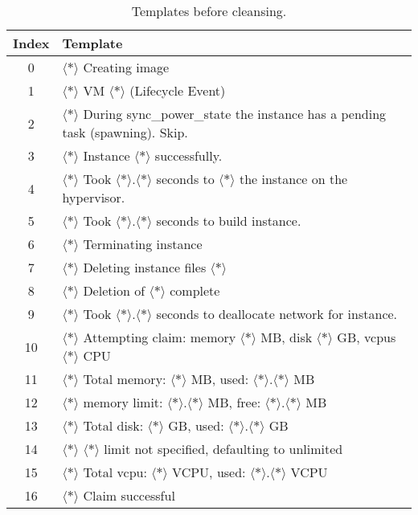 \begin{table}[ht]
\begin{small}
\centering
\begin{tabular}{ c l } 
\toprule
Index & Template \\
\midrule
0 & $\langle*\rangle$ Creating image\\
1 & $\langle*\rangle$ VM $\langle*\rangle$ (Lifecycle Event)\\
2 & $\langle*\rangle$ During sync\_power\_state the instance has a pending task (spawning). Skip.\\
3 & $\langle*\rangle$ Instance $\langle*\rangle$ successfully.\\
4 & $\langle*\rangle$ Took $\langle*\rangle$.$\langle*\rangle$ seconds to $\langle*\rangle$ the instance on the hypervisor.\\
5 & $\langle*\rangle$ Took $\langle*\rangle$.$\langle*\rangle$ seconds to build instance.\\
6 & $\langle*\rangle$ Terminating instance\\
7 & $\langle*\rangle$ Deleting instance files $\langle*\rangle$\\
8 & $\langle*\rangle$ Deletion of $\langle*\rangle$ complete\\
9 & $\langle*\rangle$ Took $\langle*\rangle$.$\langle*\rangle$ seconds to deallocate network for instance.\\
10 & $\langle*\rangle$ Attempting claim: memory $\langle*\rangle$ MB, disk $\langle*\rangle$ GB, vcpus $\langle*\rangle$ CPU\\
11 & $\langle*\rangle$ Total memory: $\langle*\rangle$ MB, used: $\langle*\rangle$.$\langle*\rangle$ MB\\
12 & $\langle*\rangle$ memory limit: $\langle*\rangle$.$\langle*\rangle$ MB, free: $\langle*\rangle$.$\langle*\rangle$ MB\\
13 & $\langle*\rangle$ Total disk: $\langle*\rangle$ GB, used: $\langle*\rangle$.$\langle*\rangle$ GB\\
14 & $\langle*\rangle$ $\langle*\rangle$ limit not specified, defaulting to unlimited\\
15 & $\langle*\rangle$ Total vcpu: $\langle*\rangle$ VCPU, used: $\langle*\rangle$.$\langle*\rangle$ VCPU\\
16 & $\langle*\rangle$ Claim successful\\
\bottomrule
\end{tabular}
\caption{Templates before cleansing.}
\label{tab:templates_before_cleansing}
\end{small}
\end{table}



